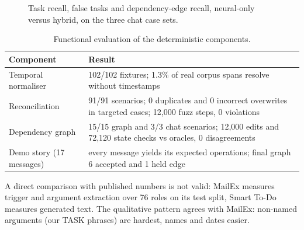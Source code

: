 \begin{figure}[htbp]
\centering
{}
\caption{Task recall, false tasks and dependency-edge recall, neural-only versus hybrid, on the three chat case sets.}
\label{fig:behaviour}
\end{figure}

\begin{table}[htbp]
\centering
\caption{Functional evaluation of the deterministic components.}
\label{tab:functional}
\footnotesize
\begin{tabularx}{\linewidth}{@{}p{32mm}L@{}}
\toprule
Component & Result \\
\midrule
Temporal normaliser & 102/102 fixtures; 1.3\% of real corpus spans resolve without timestamps \\
Reconciliation & 91/91 scenarios; 0 duplicates and 0 incorrect overwrites in targeted cases; 12,000 fuzz steps, 0 violations \\
Dependency graph & 15/15 graph and 3/3 chat scenarios; 12,000 edits and 72,120 state checks vs oracles, 0 disagreements \\
Demo story (17 messages) & every message yields its expected operations; final graph 6 accepted and 1 held edge \\
\bottomrule
\end{tabularx}
\end{table}

A direct comparison with published numbers is not valid: MailEx measures trigger and argument extraction over 76 roles on its test split, Smart To-Do measures generated text. The qualitative pattern agrees with MailEx: non-named arguments (our TASK phrases) are hardest, names and dates easier.
